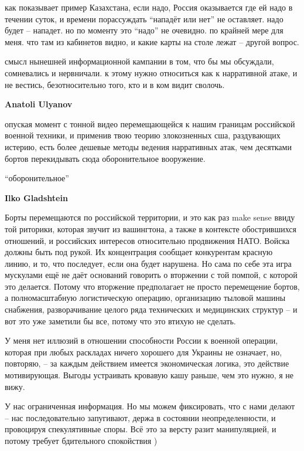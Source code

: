 \begin{itemize}
\begin{itemize}
как показывает пример Казахстана, если надо, Россия оказывается где ей надо в
течении суток, и времени порассуждать \enquote{нападёт или нет} не оставляет.
надо будет – нападет. но по моменту это \enquote{надо} не очевидно. по крайней
мере для меня. что там из кабинетов видно, и какие карты на столе лежат –
другой вопрос.

смысл нынешней информационной кампании в том, что бы мы обсуждали, сомневались
и нервничали. к этому нужно относиться как к нарративной атаке, и не вестись,
безотносительно того, кто и в ком видит сволочь.

\textbf{Anatoli Ulyanov} 

опуская момент с тонной видео перемещающейся к нашим границам российской
военной техники, и применив твою теорию злокозненных сша, раздувающих истерию,
есть более дешевые методы ведения нарративных атак, чем десятками бортов
перекидывать сюда оборонительное вооружение.

\enquote{оборонительное}

\textbf{Ilko Gladshtein} 

Борты перемещаются по российской территории, и это как раз make sense ввиду той
риторики, которая звучит из вашингтона, а также в контексте обострившихся
отношений, и российских интересов относительно продвижения НАТО. Войска должны
быть под рукой. Их концентрация сообщает конкурентам красную линию, и то, что
последует, если она будет нарушена. Но сама по себе эта игра мускулами ещё не
даёт оснований говорить о вторжении с той помпой, с которой это делается.
Потому что вторжение предполагает не просто перемещение бортов, а
полномасштабную логистическую операцию, организацию тыловой машины снабжения,
разворачивание целого ряда технических и медицинских структур – и вот это уже
заметили бы все, потому что это втихую не сделать.

У меня нет иллюзий в отношении способности России к военной операции, которая
при любых раскладах ничего хорошего для Украины не означает, но, повторяю, – за
каждым действием имеется экономическая логика, это действие мотивирующая.
Выгоды устраивать кровавую кашу раньше, чем это нужно, я не вижу.

У нас ограниченная информация. Но мы можем фиксировать, что с нами делают – нас
последовательно запугивают, держа в состоянии неопределенности, и провоцируя
спекулятивные споры. Всё это за версту разит манипуляцией, и потому требует
бдительного спокойствия )


\end{itemize}
\end{itemize}
